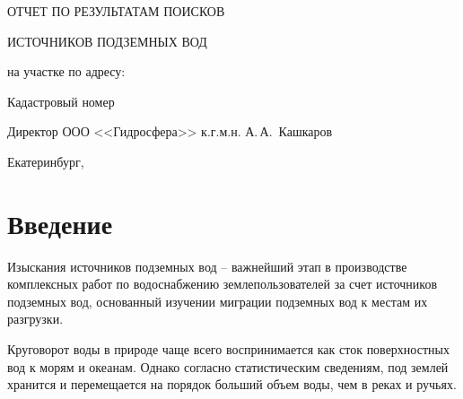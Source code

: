 \begin{titlepage}
	\begin{center}
		\textbf{\txtExecutor}
		\vspace{7.5cm}
		
		{\LARGE ОТЧЕТ ПО РЕЗУЛЬТАТАМ ПОИСКОВ}

		\bigskip

		{\LARGE ИСТОЧНИКОВ ПОДЗЕМНЫХ ВОД}
		
		\bigskip
		
		на участке по адресу:
				
		\underline{\txtAddress}
		
		\bigskip
		Кадастровый номер \txtCadaster
		
		\vfill
	
		\bigskip
		
	\end{center}

	\vfill
	
	\newlength{\ML}
	\hfill
	\begin{minipage}{1.0\textwidth}
		Директор ООО <<Гидросфера>> к.г.м.н.
		\underline{\hspace{\ML}} А.\,А.~Кашкаров\\
	\end{minipage}%
	
	\bigskip
	
	\vfill
	\begin{center}
		Екатеринбург, \txtYear
	\end{center}			

	\end{titlepage}


\section*{Введение}

Изыскания источников подземных вод -- важнейший этап в производстве комплексных работ по водоснабжению землепользователей за счет источников подземных вод, основанный изучении миграции подземных вод к местам их разгрузки.

Круговорот воды в природе чаще всего воспринимается как сток поверхностных вод к морям и океанам. Однако согласно статистическим сведениям, под землей хранится и перемещается на порядок больший объем воды, чем в реках и ручьях.

